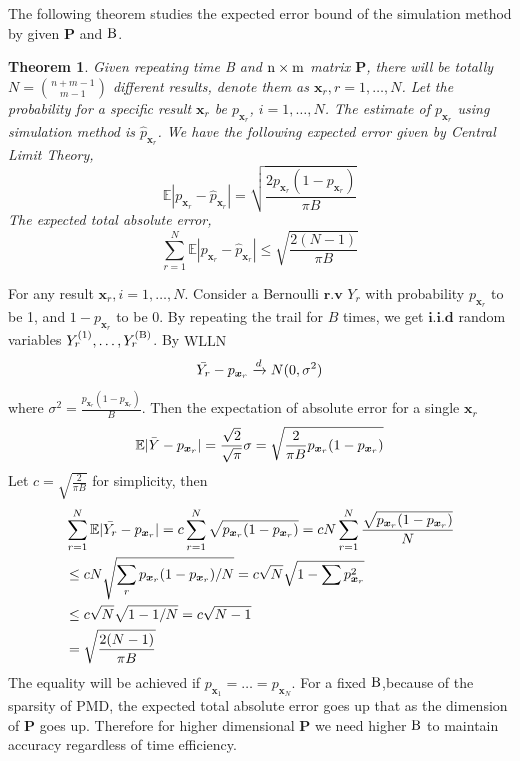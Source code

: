 \documentclass[12pt]{article}
\newcommand{\EE}{\mathbb{E}}
\newcommand{\Pmat}{\mathbf{P}}
\newcommand{\PMD}{\textrm{PMD}}
\newcommand{\wh}{\widehat}
\newtheorem{thm}{Theorem}
\begin{document}
The following theorem studies the expected error bound of the simulation method by given $\Pmat$ and $\rm B$.
\begin{thm}
Given repeating time \mbox{B} and $\rm n \times m$ matrix $\Pmat$, there will be totally  $N=\binom{n+m-1}{m-1}$ different results, denote them as  $\boldsymbol{x}_r, r=1,\dots,N$. Let the probability for a specific result $\boldsymbol{x}_{r}$ be $p_{\boldsymbol{x}_{r}}$, $i=1,\dots,N$. The estimate of  $p_{\boldsymbol{x}_{r}}$ using simulation method is $\wh{p}_{\boldsymbol{x}_r}$. We have the following expected error given by Central Limit Theory,
\begin{equation*}
    \EE|p_{\boldsymbol{x}_r} - \wh{p}_{\boldsymbol{x}_r}| =  \sqrt{\frac{2 p_{\boldsymbol{x}_r}(1-p_{\boldsymbol{x}_r})}{\pi B}}
\end{equation*}
The expected total absolute error, 
$$\sum_{r=1}^{N} \EE|p_{\boldsymbol{x}_r} - \wh{p}_{\boldsymbol{x}_r}| \leq \sqrt{\frac{2(N-1)}{\pi B}}$$

\end{thm}
For any result $\boldsymbol{x}_r,i=1,\dots,N$. Consider a Bernoulli $\textbf{r.v}$ $Y_r$ with probability $p_{\boldsymbol{x}_r}$ to be 1, and $1-p_{\boldsymbol{x}_r}$ to be 0. By repeating the trail for $B$ times, we get $\textbf{i.i.d}$ random variables $Y_r^{(1)},\dots,Y_r^{(\rm B)}$. By $\textrm{WLLN}$
\begin{equation*}
    \Bar{Y_r}-p_{\boldsymbol{x}_r} \xrightarrow{d} N(0,\sigma^2)
\end{equation*}
where $\sigma^2 = \frac{p_{\boldsymbol{x}_r}(1-p_{\boldsymbol{x}_r})}{B}$. Then the expectation of absolute error for a single $\boldsymbol{x}_r$
\begin{equation*}
    \EE |\Bar{Y}-p_{\boldsymbol{x}_r}| = \frac{\sqrt{2}}{\sqrt{\pi}}\sigma = \sqrt{\frac{2}{\pi B}p_{\boldsymbol{x}_r}(1-p_{\boldsymbol{x}_r})}
\end{equation*}
Let $c = \sqrt{\frac{2}{\pi B}}$ for simplicity, then
\begin{align*}
    & \sum_{r=1}^{N}\EE |\Bar{Y_r}-p_{\boldsymbol{x}_r}| = c \sum_{r=1}^{N} \sqrt{p_{\boldsymbol{x}_r}(1-p_{\boldsymbol{x}_r})}  = c N \sum_{r=1}^{N}\frac{\sqrt{p_{\boldsymbol{x}_r}(1-p_{\boldsymbol{x}_r})}}{N} \\
    & \leq c N \sqrt{\sum_{r}p_{\boldsymbol{x}_r}(1-p_{\boldsymbol{x}_r})/N} = c \sqrt{N} \sqrt{1-\sum p_{\boldsymbol{x}_{r}}^2}\\ &\leq c \sqrt{N} \sqrt{1-1/N} = c\sqrt{N-1}\\
    & = \sqrt{\frac{2(N-1)}{\pi B}}
\end{align*}
The equality will be achieved if $p_{\boldsymbol{x}_1} = \dots = p_{\boldsymbol{x}_N}$. For a fixed $\rm B$,because of the sparsity of $\PMD$, the expected total absolute error goes up that as the dimension of $\Pmat$ goes up. Therefore for higher dimensional $\Pmat$ we need higher $\rm B$ to maintain accuracy regardless of time efficiency.
\end{document}
